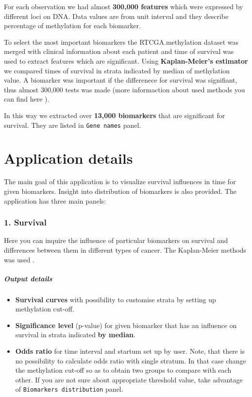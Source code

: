 For each observation we had almost \textbf{300,000 features} which were
expressed by different loci on DNA. Data values are from unit interval
and they describe percentage of methylation for each biomarker.

To select the most important biomarkers the RTCGA.methylation dataset
was merged with clinical information about each patient and time of
survival was used to extract features which are significant. Using
\textbf{Kaplan-Meier's estimator} we compared times of survival in
strata indicated by median of methylation value. A biomarker was
important if the differenece for survival was signifiant, thus almost
300,000 tests was made (more informaction about used methods you can
find here \citep{kmsurvdiff}).

In this way we extracted over \textbf{13,000 biomarkers} that are
significant for survival. They are listed in \texttt{Gene names} panel.

\section{Application details}\label{application-details}

The main goal of this application is to visualize survival influences in
time for given biomarkers. Insight into distribution of biomarkers is
also provided. The application has three main panels:

\subsubsection{1. Survival}\label{survival}

Here you can inquire the influence of particular biomarkers on survival
and differences between them in different types of cancer. The
Kaplan-Meier methods was used \citep{km}.

\subparagraph{Output details}\label{output-details}

\begin{itemize}
\itemsep1pt\parskip0pt
\item
  \textbf{Survival curves} with possibility to customise strata by
  setting up methylation cut-off.
\item
  \textbf{Significance level} (p-value) for given biomarker that has an
  influence on survival in strata indicated \textbf{by median}.
\item
  \textbf{Odds ratio} for time interval and startum set up by user.
  Note, that there is no possibility to calculate odds ratio with single
  stratum. In that case change the methylation cut-off so as to obtain
  two groups to compare with each other. If you are not sure about
  appropriate threshold value, take advantage of
  \texttt{Biomarkers distribution} panel.
\end{itemize}

